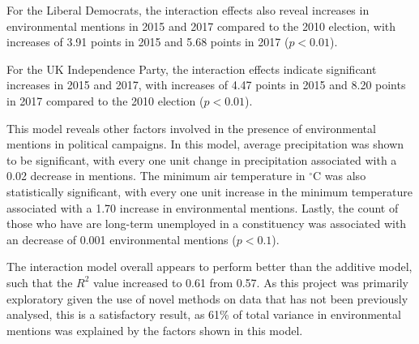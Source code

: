 \documentclass[12pt,letterpaper]{article}
\renewcommand{\headrulewidth}{0pt} %
\begin{document}
For the Liberal Democrats, the interaction effects also reveal increases in environmental mentions in 2015 and 2017 compared to the 2010 election, with increases of 3.91 points in 2015 and 5.68 points in 2017 ($p<0.01$). 

For the UK Independence Party, the interaction effects indicate significant increases in 2015 and 2017, with increases of 4.47 points in 2015 and 8.20 points in 2017 compared to the 2010 election ($p<0.01$). 

This model reveals other factors involved in the presence of environmental mentions in political campaigns. In this model, average precipitation was shown to be significant, with every one unit change in precipitation associated with a 0.02 decrease in mentions. The minimum air temperature in $^\circ$C was also statistically significant, with every one unit increase in the minimum temperature associated with a 1.70 increase in environmental mentions. Lastly, the count of those who have are long-term unemployed in a constituency was associated with an decrease of 0.001 environmental mentions ($p<0.1$). 

The interaction model overall appears to perform better than the additive model, such that the $R^2$ value increased to 0.61 from 0.57. As this project was primarily exploratory given the use of novel methods on data that has not been previously analysed, this is a satisfactory result, as 61\% of total variance in environmental mentions was explained by the factors shown in this model.



\newpage

\fancypagestyle{special}{%
	\fancyhf{} %
	\renewcommand{\headrulewidth}{0pt} %
	\renewcommand{\footrulewidth}{0pt} %
	\fancyfoot[R]{\thepage} %
}

\thispagestyle{special}
\end{document}
